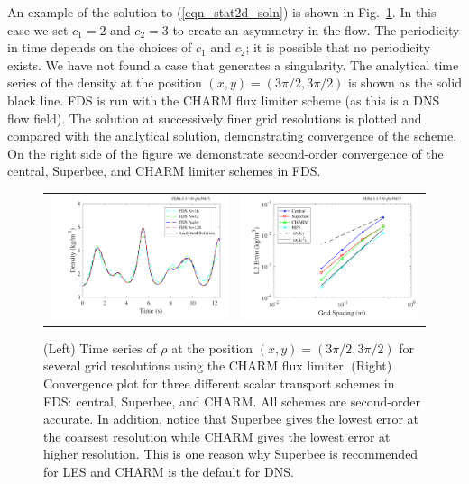 \documentclass[11pt]{book}
\begin{document}
An example of the solution to (\ref{eqn_stat2d_soln}) is shown in Fig.~\ref{fig_compression_wave}.  In this case we set $c_1 = 2$ and $c_2 = 3$ to create an asymmetry in the flow.  The periodicity in time depends on the choices of $c_1$ and $c_2$; it is possible that no periodicity exists. We have not found a case that generates a singularity. The analytical time series of the density at the position $(x,y) = (3\pi/2, 3\pi/2)$ is shown as the solid black line. FDS is run with the CHARM flux limiter scheme (as this is a DNS flow field).  The solution at successively finer grid resolutions is plotted and compared with the analytical solution, demonstrating convergence of the scheme.  On the right side of the figure we demonstrate second-order convergence of the central, Superbee, and CHARM limiter schemes in FDS.

\begin{figure}[t]
   \begin{tabular}{rl}
      \includegraphics[width=3.2in]{SCRIPT_FIGURES/compression_wave_time_series} &
      \includegraphics[width=3.2in]{SCRIPT_FIGURES/compression_wave_convergence}
   \end{tabular}
   \caption[Stationary compression wave convergence]{(Left) Time series of $\rho$ at the position $(x,y) = (3\pi/2, 3\pi/2)$ for several grid resolutions using the CHARM flux limiter. (Right) Convergence plot for three different scalar transport schemes in FDS: central, Superbee, and CHARM.  All schemes are second-order accurate.  In addition, notice that Superbee gives the lowest error at the coarsest resolution while CHARM gives the lowest error at higher resolution.  This is one reason why Superbee is recommended for LES and CHARM is the default for DNS.}
   \label{fig_compression_wave}
\end{figure}
\end{document}
